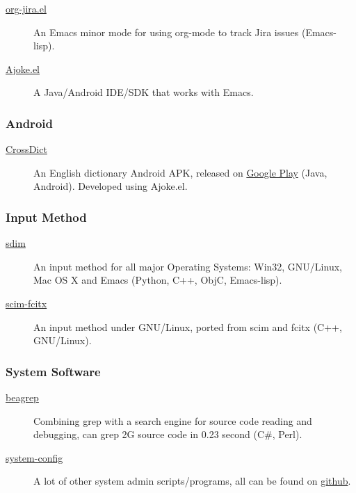 \documentclass[11pt,dvipdfmx,CJKbookmarks]{article}
\begin{document}
\begin{CJK*}{UTF8}{simsun}
\begin{description}
\item[{\href{https://github.com/baohaojun/org-jira}{org-jira.el}}] An Emacs minor mode for using org-mode to track
Jira issues (Emacs-lisp).

\item[{\href{https://github.com/baohaojun/ajoke}{Ajoke.el}}] A Java/Android IDE/SDK that works with Emacs.
\end{description}

\subsubsection{Android}
\label{sec-2-0-2}

\begin{description}
\item[{\href{https://github.com/baohaojun/BTAndroidWebViewSelection}{CrossDict}}] An English dictionary Android APK, released on \href{https://play.google.com/store/apps/details?id=com.baohaojun.crossdict}{Google
Play} (Java, Android). Developed using Ajoke.el.
\end{description}
\subsubsection{Input Method}
\label{sec-2-0-3}
\begin{description}
\item[{\href{https://github.com/baohaojun/system-config/tree/master/gcode/scim-cs/ime-py}{sdim}}] An input method for all major Operating Systems: Win32,
GNU/Linux, Mac OS X and Emacs (Python, C++, ObjC,
Emacs-lisp).

\item[{\href{https://github.com/scim-im/scim-fcitx}{scim-fcitx}}] An input method under GNU/Linux, ported from scim
and fcitx (C++, GNU/Linux).
\end{description}

\subsubsection{System Software}
\label{sec-2-0-4}

\begin{description}
\item[{\href{https://github.com/baohaojun/beagrep}{beagrep}}] Combining grep with a search engine for source code
reading and debugging, can grep 2G source code in 0.23
second (C\#, Perl).

\item[{\href{https://github.com/baohaojun/system-config}{system-config}}] A lot of other system admin scripts/programs, all
can be found on \href{https://github.com/baohaojun}{github}.
\end{description}



\end{CJK*}
\end{document}

